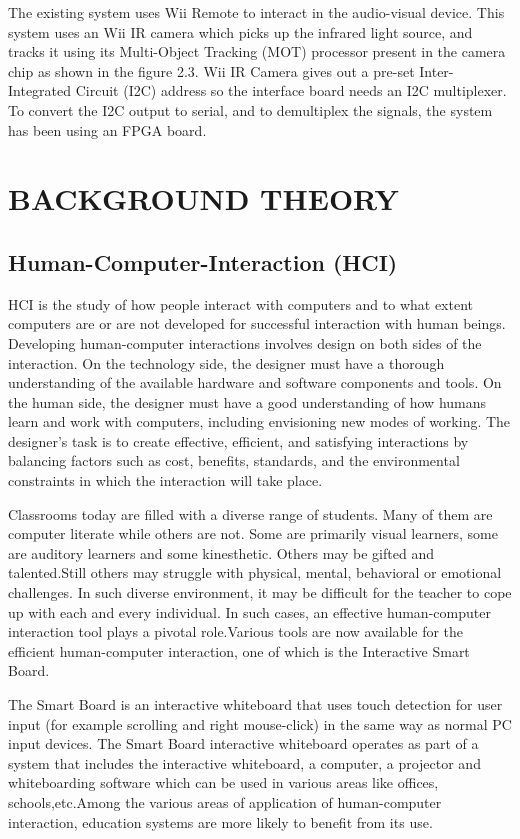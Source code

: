 \documentclass[12pt, a4paper]{article}
\begin{document}
The existing system uses Wii Remote to interact in the audio-visual device. This system uses an Wii IR camera which picks up the infrared light source, and tracks it using its Multi-Object Tracking (MOT) processor present in the camera chip as shown in the figure 2.3. Wii IR Camera gives out a pre-set Inter-Integrated Circuit (I2C) address so the interface board needs an I2C multiplexer. To convert the I2C output to serial, and to demultiplex the signals, the system has been using an FPGA board. 
\newpage
\section{BACKGROUND THEORY}
\subsection{Human-Computer-Interaction (HCI)} 
HCI is the study of how people interact with computers and to what extent computers are or are not developed for successful interaction with human beings. Developing human-computer interactions involves design on both sides of the interaction. On the technology side, the designer must have a thorough understanding of the available hardware and software components and tools. On the human side, the designer must have a good understanding of how humans learn and work with computers, including envisioning new modes of working. The designer's task is to create effective, efficient, and satisfying interactions by balancing factors such as cost, benefits, standards, and the environmental constraints in which the interaction will take place. 

Classrooms today are filled with a diverse range of students. Many of them are computer literate while others are not. Some are primarily visual learners, some are auditory learners and some kinesthetic. Others may be gifted and talented.Still others may struggle with physical, mental, behavioral or emotional challenges. In such diverse environment, it may be difficult for the teacher to cope up with each and every individual. In such cases, an effective human-computer interaction tool plays a pivotal role.Various tools are now available for the efficient human-computer interaction, one of which is the Interactive Smart Board.

The Smart Board is an interactive whiteboard that uses touch detection for user input (for example scrolling and right mouse-click) in the same way as normal PC input devices. The Smart Board interactive whiteboard operates as part of a system that includes the interactive whiteboard, a computer, a projector and whiteboarding software which can be used in various areas like offices, schools,etc.Among the various areas of application of human-computer interaction, education systems are more likely to benefit from its use.
\end{document}
